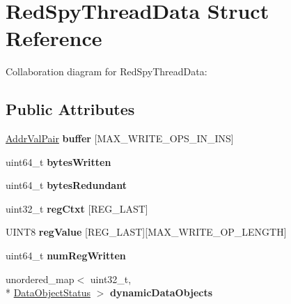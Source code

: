\hypertarget{structRedSpyThreadData}{\section{Red\-Spy\-Thread\-Data Struct Reference}
\label{structRedSpyThreadData}
}


Collaboration diagram for Red\-Spy\-Thread\-Data\-:
\subsection*{Public Attributes}
\begin{DoxyCompactItemize}
\item 
\hypertarget{structRedSpyThreadData_a742275c039a4aac95677a50c14c31071}{\hyperlink{structAddrValPair}{Addr\-Val\-Pair} {\bfseries buffer} \mbox{[}M\-A\-X\-\_\-\-W\-R\-I\-T\-E\-\_\-\-O\-P\-S\-\_\-\-I\-N\-\_\-\-I\-N\-S\mbox{]}}\label{structRedSpyThreadData_a742275c039a4aac95677a50c14c31071}

\item 
\hypertarget{structRedSpyThreadData_a1e5f7f3d2dff39d146bfd998437dc5ce}{uint64\-\_\-t {\bfseries bytes\-Written}}\label{structRedSpyThreadData_a1e5f7f3d2dff39d146bfd998437dc5ce}

\item 
\hypertarget{structRedSpyThreadData_aaef802b94eb3d105b589828742f587ac}{uint64\-\_\-t {\bfseries bytes\-Redundant}}\label{structRedSpyThreadData_aaef802b94eb3d105b589828742f587ac}

\item 
\hypertarget{structRedSpyThreadData_ae037db3b48bfee05ab1142d1b29e2ee5}{uint32\-\_\-t {\bfseries reg\-Ctxt} \mbox{[}R\-E\-G\-\_\-\-L\-A\-S\-T\mbox{]}}\label{structRedSpyThreadData_ae037db3b48bfee05ab1142d1b29e2ee5}

\item 
\hypertarget{structRedSpyThreadData_aef0c04703b8f30f19de9168520902261}{U\-I\-N\-T8 {\bfseries reg\-Value} \mbox{[}R\-E\-G\-\_\-\-L\-A\-S\-T\mbox{]}\mbox{[}M\-A\-X\-\_\-\-W\-R\-I\-T\-E\-\_\-\-O\-P\-\_\-\-L\-E\-N\-G\-T\-H\mbox{]}}\label{structRedSpyThreadData_aef0c04703b8f30f19de9168520902261}

\item 
\hypertarget{structRedSpyThreadData_ac6ab8508dc5d0454c04591613b7ac69f}{uint64\-\_\-t {\bfseries num\-Reg\-Written}}\label{structRedSpyThreadData_ac6ab8508dc5d0454c04591613b7ac69f}

\item 
\hypertarget{structRedSpyThreadData_a069952ae89ec0cab991f3d6ed452c1f3}{unordered\-\_\-map$<$ uint32\-\_\-t, \\*
\hyperlink{structdataObjectStatus}{Data\-Object\-Status} $>$ {\bfseries dynamic\-Data\-Objects}}\label{structRedSpyThreadData_a069952ae89ec0cab991f3d6ed452c1f3}


\end{DoxyCompactItemize}
